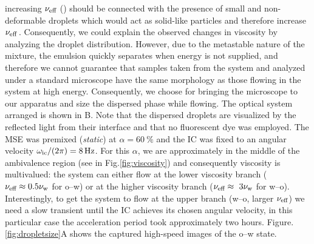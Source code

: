 increasing $\nu_\text{eff}$ () should be connected with the presence of small and non-deformable droplets which would act as solid-like particles and therefore increase
$\nu_\text{eff}$\,\cite{Stickel2005,Bakhuis2018}.
Consequently, we could explain the observed changes in viscosity by analyzing the droplet distribution. However, due to the metastable nature of the mixture, the emulsion quickly separates when energy is not supplied, and therefore we cannot guarantee that samples taken from the system and analyzed under a standard microscope have the same morphology as those flowing in the system at high energy. Consequently, we choose for bringing the microscope to our apparatus and size the dispersed phase while flowing. The
optical system arranged is shown in B. Note that the dispersed droplets are visualized by the reflected light from their interface and that no fluorescent dye was employed. The MSE was premixed
(\emph{static}) at $\alpha=\SI{60}{\percent}$ and the IC was fixed to an
angular velocity $\omega_\text{ic}/(2\pi) = \SI{8}{\hertz}$. For this $\alpha$, we are
approximately in the middle of the ambivalence region (see in  Fig.\ref{fig:viscosity}) and consequently viscosity is multivalued: the system can either flow at the lower viscosity branch ($\nu_\text{eff} \approx 0.5\nu_\text{w}$ for o--w) or at the higher viscosity branch ($\nu_\text{eff} \approx~ 3\nu_\text{w}$ for w--o). Interestingly, to get the system to flow at the upper branch (w--o, larger $\nu_\text{eff}$) we need a slow transient until the IC achieves its chosen angular velocity, in this particular case the acceleration period took approximately two hours. 
Figure.\,\ref{fig:dropletsize}A shows the captured high-speed images of the o--w state. 
%
